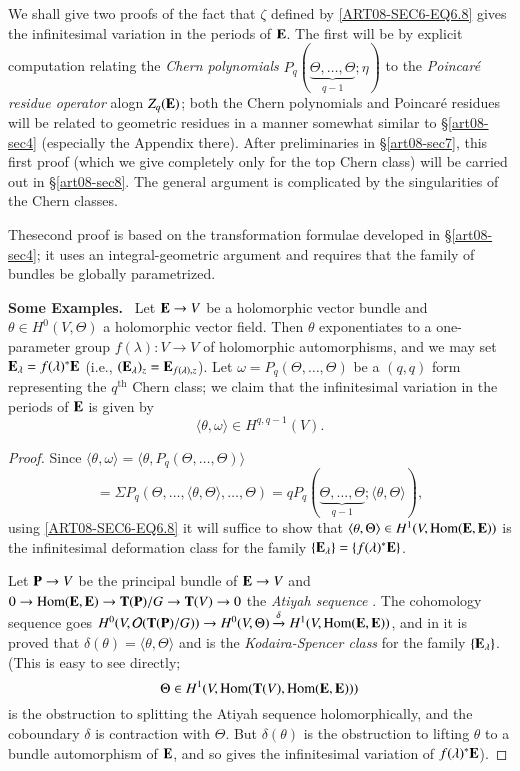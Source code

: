 We shall give two proofs of the fact that $\zeta$ defined by \eqref{ART08-SEC6-EQ6.8} gives the infinitesimal variation in the periods of $\mathbf{E}$. The first will be by explicit computation relating the {\em Chern polynomials} $P_{q}(\underbrace{\Theta,\ldots,\Theta}_{q-1};\eta)$ to the {\em Poincar\'e residue operator} alogn $Z_{q}(\mathbf{E})$; both the Chern polynomials and Poincar\'e residues will be related to geometric residues in a manner somewhat similar to \S\ref{art08-sec4} (especially the Appendix there). After preliminaries in \S\ref{art08-sec7}, this first proof (which we give completely only for the top Chern class) will be carried out in \S\ref{art08-sec8}. The general argument is complicated by the singularities of the Chern classes.

The\pageoriginale second proof is based on the transformation formulae developed in \S\ref{art08-sec4}; it uses an integral-geometric argument and requires that the family of bundles be globally parametrized.

\medskip
\noindent
{\bf Some Examples.}~ Let $\mathbf{E}\to V$ be a holomorphic vector bundle and $\theta\in H^{0}(V,\Theta)$ a holomorphic vector field. Then $\theta$ exponentiates to a one-parameter group $f(\lambda):V\to V$ of holomorphic automorphisms, and we may set $\mathbf{E}_{\lambda}=f(\lambda)^{*}\mathbf{E}$ (i.e., $(\mathbf{E}_{\lambda})_{z}=\mathbf{E}_{f(\lambda),z}$). Let $\omega=P_{q}(\Theta,\ldots,\Theta)$ be a $(q,q)$ form representing the $q^{\text{th}}$ Chern class; we claim that the infinitesimal variation in the periods of $\mathbf{E}$ is given by
\begin{equation*}
\langle \theta,\omega\rangle \in H^{q,q-1}(V).\tag{6.9}\label{art08-sec6-eq6.9}
\end{equation*}

\begin{proof}
Since $\langle \theta,\omega\rangle=\langle \theta, P_{q}(\Theta,\ldots,\Theta)\rangle$
$$
=\Sigma P_{q}(\Theta,\ldots,\langle \theta,\Theta\rangle,\ldots,\Theta)=qP_{q}(\underbrace{\Theta,\ldots,\Theta}_{q-1};\langle \theta,\Theta\rangle),
$$
using \eqref{ART08-SEC6-EQ6.8} it will suffice to show that $\langle \theta,\Theta\rangle\in H^{1}(V,\operatorname{\mathrm{Hom}}(\mathbf{E},\mathbf{E}))$ is the infinitesimal deformation class for the family $\{\mathbf{E}_{\lambda}\}=\{f(\lambda)^{*}\mathbf{E}\}$. 

Let $\mathbf{P}\to V$ be the principal bundle of $\mathbf{E}\to V$ and $0\to \Hom(\bfE,\bfE)\break \to \bfT(\bfP)/G\to \bfT(V)\to 0$ the {\em Atiyah sequence} \cite{art08-key1}. The cohomology sequence goes $H^{0}(V,\mathcal{O}(\mathbf{T}(\mathbf{P})/G))\to H^{0}(V,\Theta)\xrightarrow{\delta} H^{1}(V,\operatorname{\mathrm{Hom}}(\mathbf{E},\mathbf{E}))$, and in \cite{art08-key8} it is proved that $\delta(\theta)=\langle \theta,\Theta\rangle$ and is the {\em Kodaira-Spencer class} for the family $\{\mathbf{E}_{\lambda}\}$. (This is easy to see directly; 
$$
\Theta\in H^{1}(V,\operatorname{\mathrm{Hom}}(\mathbf{T}(V),\operatorname{\mathrm{Hom}}(\mathbf{E},\mathbf{E})))
$$ 
is the obstruction to splitting the Atiyah sequence holomorphically, and the coboundary $\delta$ is contraction with $\Theta$. But $\delta(\theta)$ is the obstruction to lifting $\theta$ to a bundle automorphism of $\mathbf{E}$, and so gives the infinitesimal variation of $f(\lambda)^{*}\mathbf{E}$).
\end{proof}

